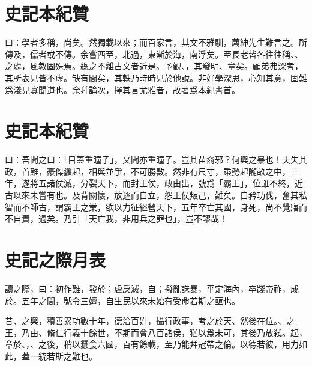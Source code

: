\section[五帝本紀贊\quad{\small 史記}]{{\normalsize 史記}\quad {}本紀贊}
曰：學者多稱，尚矣。然獨載以來；而百家言，其文不雅馴，薦紳先生難言之。所傳及，儒者或不傳。余嘗西至，北過，東漸於海，南浮矣。至長老皆各往往稱、、之處，風教固殊焉。總之不離古文者近是。予觀、，其發明、章矣。顧弟弗深考，其所表見皆不虛。缺有間矣，其軼乃時時見於他說。非好學深思，心知其意，固難爲淺見寡聞道也。余幷論次，擇其言尤雅者，故著爲本紀書首。

\section[項羽本紀贊\quad{\small 史記}]{{\normalsize 史記}\quad{}本紀贊}
曰：吾聞之曰：「目蓋重瞳子」，又聞亦重瞳子。豈其苗裔邪？何興之暴也！夫失其政，首難，豪傑蠭起，相與並爭，不可勝數。然非有尺寸，乘勢起隴畝之中，三年，遂將五諸侯滅，分裂天下，而封王侯，政由出，號爲「霸王」，位雖不終，近古以來未嘗有也。及背關懷，放逐而自立，怨王侯叛己，難矣。自矜功伐，奮其私智而不師古，謂霸王之業，欲以力征經營天下，五年卒亡其國，身死，尚不覺寤而不自責，過矣。乃引「天亡我，非用兵之罪也」，豈不謬哉！

\section[秦楚之際月表\quad{\small 史記}]{{\normalsize 史記}\quad{}之際月表}
讀之際，曰：初作難，發於；虐戾滅，自；撥亂誅暴，平定海內，卒踐帝祚，成於。五年之間，號令三嬗，自生民以來未始有受命若斯之亟也。

昔、之興，積善累功數十年，德洽百姓，攝行政事，考之於天、然後在位。、之王，乃由、脩仁行義十餘世，不期而會八百諸侯，猶以爲未可，其後乃放弒。起，章於、，、之後，稍以蠶食六國，百有餘載，至乃能幷冠帶之倫。以德若彼，用力如此，蓋一統若斯之難也。

